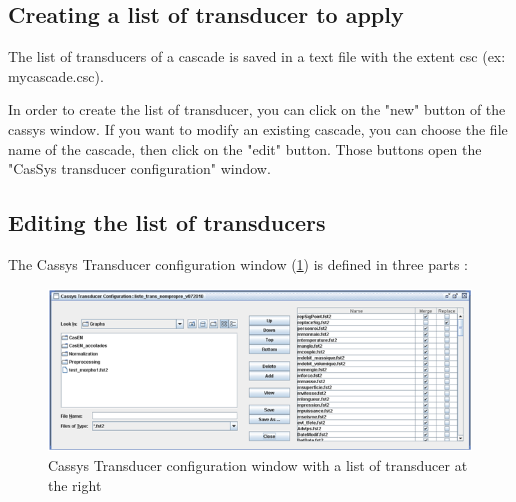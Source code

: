 \subsection{Creating a list of transducer to apply}
\label{subsec:listTrans}

The list of transducers of a cascade is saved in a text file with the extent csc (ex: mycascade.csc).

\bigskip
\noindent In order to create the list of transducer, you can click on the "new" button of the cassys window. 
If you want to modify an existing cascade, you can choose the file name of the cascade, then click on the "edit" button. 
Those buttons open the "CasSys transducer configuration" window.

\subsection{Editing the list of transducers}
\label{subsec:editlistTrans}

The Cassys Transducer configuration window (\ref{fig13-03}) is defined in three parts :

\begin{figure}[!htb]
  \centering
  \includegraphics[width=14cm]{resources/img/fig13-03.png}
  \caption{Cassys Transducer configuration window with a list of transducer at the right}
  \label{fig13-03}
\end{figure}

